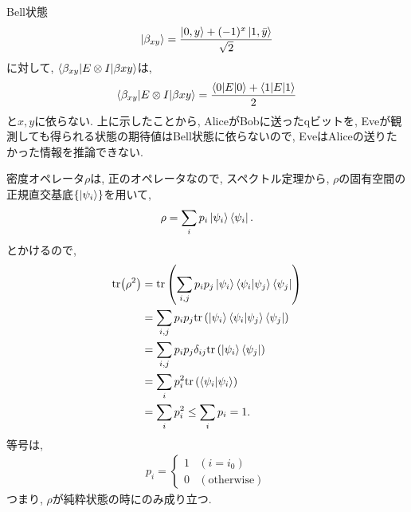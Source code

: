 \begin{ex}
    \label{ex2.70}
    Bell状態
    \begin{align*}
        \ket{\beta_{xy}} = \frac{\ket{0,y}+ (-1)^x\ket{1,\bar{y}}}{\sqrt{2}}
    \end{align*}
    に対して, $\braket{\beta_{xy}|E \otimes I| \beta{xy}}$は,
    \begin{align*}
        \braket{\beta_{xy}|E \otimes I| \beta{xy}}
        =
        \frac{\braket{0|E|0} + \braket{1|E|1}}{2}
    \end{align*}
    と$x,y$に依らない. 上に示したことから, AliceがBobに送ったqビットを, Eveが観測しても得られる状態の期待値はBell状態に依らないので, EveはAliceの送りたかった情報を推論できない.
\end{ex}

\begin{ex}
    \label{ex2.71}
    密度オペレータ$\rho$は, 正のオペレータなので, スペクトル定理から, $\rho$の固有空間の正規直交基底$\{ \ket{\psi_i}\}$を用いて, 
    \begin{align*}
        \rho = \sum_i p_i \ket{\psi_i}\bra{\psi_i}.
    \end{align*}
    とかけるので,
    \begin{align*}
        \mathrm{tr}{\left(\rho^2 \right)}
         & =
        \mathrm{tr}
        \left(
        \sum_{i,j} p_i p_j \ket{\psi_i}\braket{\psi_i|\psi_j}\bra{\psi_j}
        \right)                                                  \\
         & =
        \sum_{i,j} p_i p_j
        \mathrm{tr}
        \left(
        \ket{\psi_i}\braket{\psi_i|\psi_j}\bra{\psi_j}
        \right)                                                  \\
         & =
        \sum_{i,j} p_i p_j
        \delta_{ij}
        \mathrm{tr}
        \left(
        \ket{\psi_i}\bra{\psi_j}
        \right)                                                  \\
         & =
        \sum_{i} p_i ^2
        \mathrm{tr}
        \left(
        \braket{\psi_i|{\psi_i}}
        \right)                                                  \\
         & =\sum_{i} p_i ^2 \le \sum_{i} p_i = 1.
    \end{align*}
    等号は,
    \begin{align*}
        p_i =
        \begin{cases}
            1 & (i=i_0)              \\
            0 & (\mathrm{otherwise})
        \end{cases}
    \end{align*}
    つまり, $\rho$が純粋状態の時にのみ成り立つ.
\end{ex}

